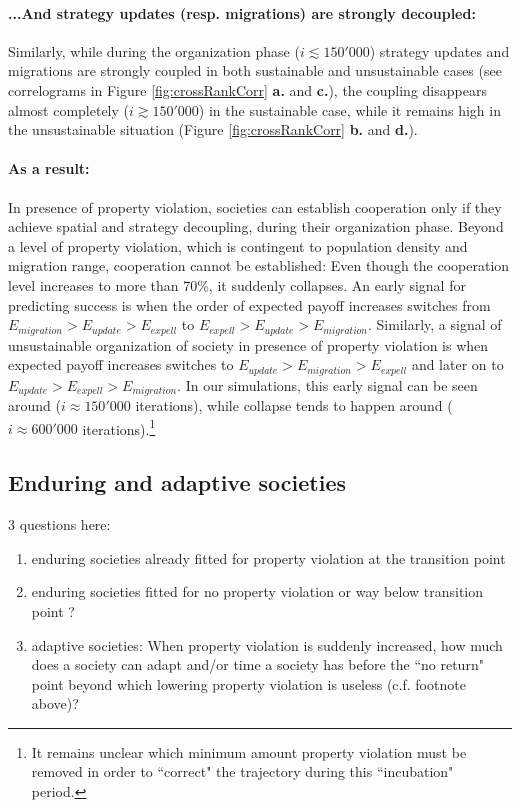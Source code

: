 \paragraph{...And strategy updates (resp. migrations) are strongly decoupled:}
Similarly, while during the organization phase ($i \lesssim 150'000$) strategy updates and migrations are strongly coupled in both sustainable and unsustainable cases (see correlograms in Figure \ref{fig:crossRankCorr} {\bf a.} and {\bf c.}), the coupling disappears almost completely ($i \gtrsim 150'000$) in the sustainable case, while it remains high in the unsustainable situation (Figure \ref{fig:crossRankCorr} {\bf b.} and {\bf d.}).

\paragraph{As a result:}  In presence of property violation, societies can establish cooperation only if  they achieve spatial and strategy decoupling, during their organization phase. Beyond a level of property violation, which is contingent to population density and migration range, cooperation cannot be established: Even though the cooperation level increases to more than 70\%, it suddenly collapses. An early signal for predicting success is when the order of expected payoff increases switches from $E_{migration} > E_{update} > E_{expell}$ to $ E_{expell} > E_{update} > E_{migration}$. Similarly, a signal of unsustainable organization of society in presence of property violation is when expected payoff increases switches to $ E_{update} > E_{migration} > E_{expell}$ and later on to $ E_{update} > E_{expell} > E_{migration}$. In our simulations, this early signal can be seen around ($i \approx 150'000$ iterations), while collapse tends to happen around ($i \approx 600'000$ iterations).\footnote{It remains unclear which minimum amount property violation must be removed in order to ``correct" the trajectory during this ``incubation" period.}

\subsection*{Enduring and adaptive societies}

3 questions here:

\begin{enumerate}
  \item enduring societies already fitted for property violation at the transition point
  \item enduring societies fitted for no property violation or way below transition point ?
  \item adaptive societies: When property violation is suddenly increased, how much does a society can adapt and/or time a society has before the ``no return" point beyond which lowering property violation is useless (c.f. footnote above)? 
\end{enumerate}

